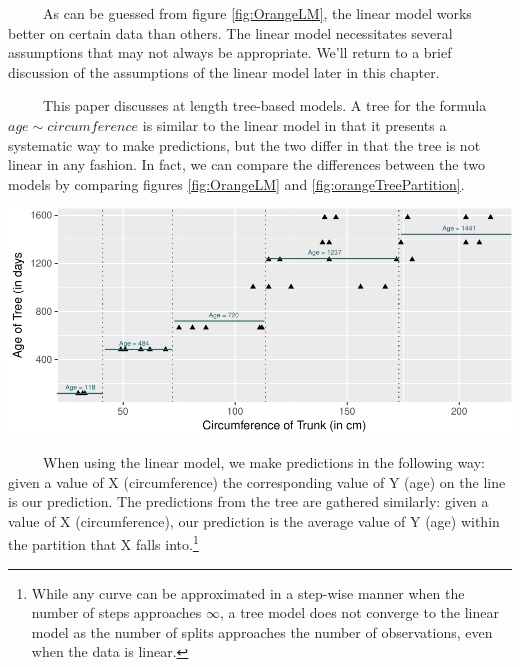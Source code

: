 \documentclass[12pt,twoside]{reedthesis}
\let\origfigure\figure
\let\endorigfigure\endfigure
\renewenvironment{figure}[1][2] {
    \expandafter\origfigure\expandafter[H]
} {
    \endorigfigure
}
\begin{document}
  ~~~~~As can be guessed from figure \ref{fig:OrangeLM}, the linear model
  works better on certain data than others. The linear model necessitates
  several assumptions that may not always be appropriate. We'll return to
  a brief discussion of the assumptions of the linear model later in this
  chapter.
  
  ~~~~~This paper discusses at length tree-based models. A tree for the
  formula \(age \sim circumference\) is similar to the linear model in
  that it presents a systematic way to make predictions, but the two
  differ in that the tree is not linear in any fashion. In fact, we can
  compare the differences between the two models by comparing figures
  \ref{fig:OrangeLM} and \ref{fig:orangeTreePartition}.
  
  \begin{figure}[H]
  
  {\centering \includegraphics{Thesis_files/figure-latex/unnamed-chunk-6-1} 
  
  }
  
  \caption{\label{fig:orangeTreePartition}A tree modeling the formula age \(\sim\)  trunk circumference first creates partitions on the predictor, seen as vertical lines, and then predicts the value of the response within that partition, seen as text.}\label{fig:unnamed-chunk-6}
  \end{figure}
  
  ~~~~~When using the linear model, we make predictions in the following
  way: given a value of X (circumference) the corresponding value of Y
  (age) on the line is our prediction. The predictions from the tree are
  gathered similarly: given a value of X (circumference), our prediction
  is the average value of Y (age) within the partition that X falls
  into.\footnote{While any curve can be approximated in a step-wise manner
    when the number of steps approaches \(\infty\), a tree model does not
    converge to the linear model as the number of splits approaches the
    number of observations, even when the data is linear.}
  
\end{document}
